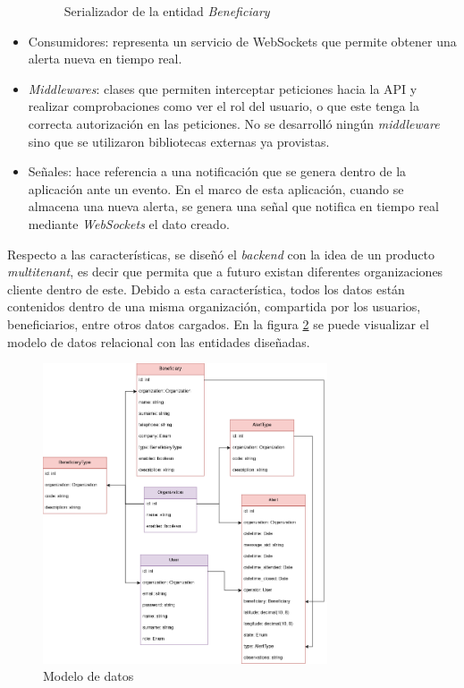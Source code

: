 \begin{itemize}
\begin{figure}[H]
	\caption{Serializador de la entidad \textit{Beneficiary}}
	\label{backend:view1}
    \end{figure}
    \item Consumidores: representa un servicio de WebSockets que permite obtener una alerta nueva en tiempo real.
    \item \textit{Middlewares}: clases que permiten interceptar peticiones hacia la API\citep{DJANGO:10} y realizar comprobaciones como ver el rol del usuario, o que este tenga la correcta autorización en las peticiones. No se desarrolló ningún \textit{middleware} sino que se utilizaron bibliotecas externas ya provistas.
    \item Señales: hace referencia a una notificación que se genera dentro de la aplicación ante un evento\citep{DJANGO:11}. En el marco de esta aplicación, cuando se almacena una nueva alerta, se genera una señal que notifica en tiempo real mediante \textit{WebSockets} el dato creado.
\end{itemize}

Respecto a las características, se diseñó el \textit{backend} con la idea de un producto \textit{multitenant}, es decir que permita que a futuro existan diferentes organizaciones cliente dentro de este\citep{DJANGO:12}. Debido a esta característica, todos los datos están contenidos dentro de una misma organización, compartida por los usuarios, beneficiarios, entre otros datos cargados. En la figura \ref{backend:modelo} se puede visualizar el modelo de datos relacional con las entidades diseñadas.

\begin{figure}[H]
	\centering
	\includegraphics[width=0.75\textwidth]{./Figures/backend-modelos.png}
	\caption{Modelo de datos}
	\label{backend:modelo}
\end{figure}


